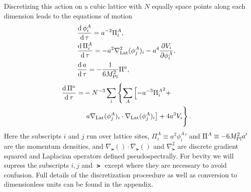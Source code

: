 Discretizing this action on a cubic lattice with $N$ equally space points along each dimension leads to the equations of motion
\begin{align}
  & \frac{\mathrm{d}\,\phi^A_i}{\mathrm{d}\,\tau} = a^{-2}\Pi^A_i,  \label{eq:lat eom a}\\
  & \frac{\mathrm{d}\,\Pi^A_i}{\mathrm{d}\,\tau} = -a^2\nabla^2_{\mathrm{Lat}}(\phi^A_j)_i -a^4\frac{\partial V_i}{\partial \phi^A_i},  \label{eq:lat eom pi a}\\
  & \frac{\mathrm{d}\, a}{\mathrm{d}\,\tau} = -\frac{1}{6M_{\mathrm{Pl}}^2}\Pi^a,  \label{eq:lat eom phi}
\end{align}
\begin{align}
  \begin{split}
    \frac{\mathrm{d}\,\Pi^a}{\mathrm{d}\,\tau} = &-N^{-3}\sum_i\left\{
    \sum_A\left[-a^{-3}{\Pi^A_i}^2 + \right.\right. \\
    &  \left.\left. a\nabla_{\mathrm{Lat}}(\phi^A_j)_i\cdot\nabla_{\mathrm{Lat}}(\phi^A_j)_i \right]
    + 4a^3V_i\vphantom{\sum_A}\right\}.
  \end{split} \label{eq:lat eom pi phi}  
\end{align}
Here the subscripts $i$ and $j$ run over lattice sites, $\Pi^A_i \equiv a^2{\phi^A_i}'$ and $\Pi^A \equiv -6M_{\mathrm{Pl}}^2a'$ are the momentum densities, and $\nabla_\lat()\cdot\nabla_\lat()$ and $\nabla^2_\lat$ are discrete gradient squared and Laplacian operators defined pseudospectrally.
For bevity we will supress the subscripts $i,j$ and $\lat$ except where they are necessary to avoid confusion.
Full details of the discretization proceedure as well as conversion to dimensionless units can be found in the appendix.


